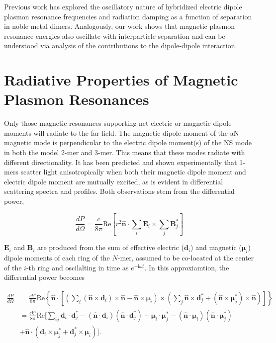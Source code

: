 \documentclass[journal=apchd5,manuscript=article]{achemso}
\begin{document}
Previous work has explored the oscillatory nature of hybridized electric dipole plasmon resonance frequencies and radiation damping as a function of separation in noble metal dimers\cite{vonPlessen2007}. Analogously, our work shows that magnetic plasmon resonance energies also oscillate with interparticle separation and can be understood via analysis of the contributions to the dipole-dipole interaction.

\section{Radiative Properties of Magnetic Plasmon Resonances}
Only those magnetic resonances supporting net electric or magnetic dipole moments will radiate to the far field. The magnetic dipole moment of the aN magnetic mode is perpendicular to the electric dipole moment(s) of the NS mode in both the model 2-mer and 3-mer. This means that these modes radiate with different directionality. It has been predicted and shown experimentally that 1-mers scatter light anisotropically when both their magnetic dipole moment and electric dipole moment are mutually excited,\cite{Dionne2011,Cherqui2016} as is evident in differential scattering spectra and profiles. Both observations stem from the differential power,\cite{jackson_classical_1999,schwinger1998classical}

\begin{equation}
\frac{dP}{d\Omega} = \frac{c}{8\pi}\textrm{Re}\left[r^2\hat{\textbf{n}}\cdot\sum_i\textbf{E}_i \times \sum_{j}\textbf{B}_{j}^*\right]
\label{dp_field_1}
\end{equation}

\noindent $\textbf{E}_i$ and $\textbf{B}_i$ are produced from the sum of effective electric ($\textbf{d}_i$) and magnetic ($\boldsymbol{\mu}_i$) dipole moments of each ring of the $N$-mer, assumed to be co-located at the center of the $i$-th ring and oscilalting in time as $e^{-\textrm{i}\omega t}$. In this approxiamtion, the differential power becomes\cite{Alu2006}

\begin{equation}
\begin{aligned}
\frac{dP}{d\Omega} &= \frac{ck^4}{8\pi} \textrm{Re} \left\{\hat{\textbf{n}} \cdot \left[\left(\sum_{i} (\hat{\textbf{n}} \times \textbf{d}_i) \times \hat{\textbf{n}} - \hat{\textbf{n}} \times \boldsymbol{\mu}_i\right) \times \left(\sum_{j} \hat{\textbf{n}} \times \textbf{d}_j^* + (\hat{\textbf{n}} \times \boldsymbol{\mu}_j^*) \times \hat{\textbf{n}}\right)\right]\right\}\\
&= \frac{ck^4}{8\pi} \textrm{Re} \Bigg[ \sum_{ij} \textbf{d}_i \cdot \textbf{d}_j^* - (\hat{\textbf{n}} \cdot \textbf{d}_i)(\hat{\textbf{n}} \cdot \textbf{d}_j^*) + \boldsymbol{\mu}_i \cdot \boldsymbol{\mu}_j^* - (\hat{\textbf{n}} \cdot \boldsymbol{\mu}_i)(\hat{\textbf{n}} \cdot \boldsymbol{\mu}_j^*) \\ &+ \hat{\textbf{n}} \cdot (\textbf{d}_i \times \boldsymbol{\mu}_j^* + \textbf{d}_j^* \times \boldsymbol{\mu}_i) \Bigg].
\label{dp_dipoles_1}
\end{aligned}
\end{equation}
\end{document}
